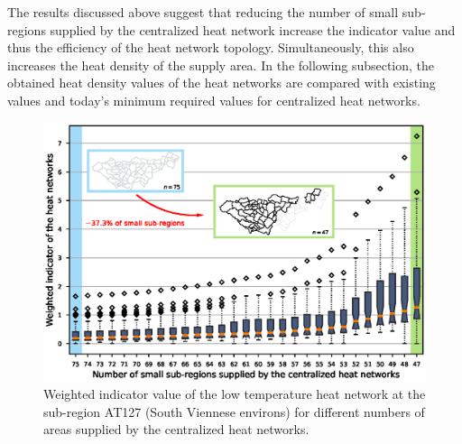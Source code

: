The results discussed above suggest that reducing the number of small sub-regions supplied by the centralized heat network increase the indicator value and thus the efficiency of the heat network topology. Simultaneously, this also increases the heat density of the supply area. In the following subsection, the obtained heat density values of the heat networks are compared with existing values and today's minimum required values for centralized heat networks.


\begin{figure}
	\centering
	\includegraphics[width=1\linewidth]{figures/4_Results/boxplot.eps}
	\caption{Weighted indicator value of the low temperature heat network at the sub-region AT127 (South Viennese environs) for different numbers of areas supplied by the centralized heat networks.}
	\label{fig:res3}
\end{figure}
\newpage
